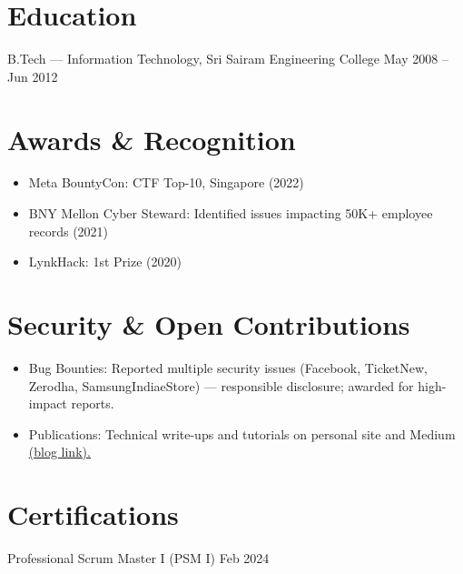 \documentclass[a4paper,10pt]{article}
\begin{document}
\newpage

\section{Education}
B.Tech — Information Technology, Sri Sairam Engineering College \hfill May 2008 -- Jun 2012

\section{Awards \& Recognition}
\begin{itemize}
  \item Meta BountyCon: CTF Top-10, Singapore (2022)
  \item BNY Mellon Cyber Steward: Identified issues impacting 50K+ employee records (2021)
  \item LynkHack: 1st Prize (2020)
\end{itemize}

\section{Security \& Open Contributions}
\begin{itemize}
  \item Bug Bounties: Reported multiple security issues (Facebook, TicketNew, Zerodha, SamsungIndiaeStore) — responsible disclosure; awarded for high-impact reports.
  \item Publications: Technical write-ups and tutorials on personal site and Medium \href{https://medium.com/@rajsek/hacky-way-to-viewing-instagram-redux-actions-b6ae59cbafc8?utm_source=resume&utm_medium=article&utm_campaign=job_search}{\underline{(blog link).}} \\
\end{itemize}

\section{Certifications}
Professional Scrum Master I (PSM I) \hfill Feb 2024

\end{document}
